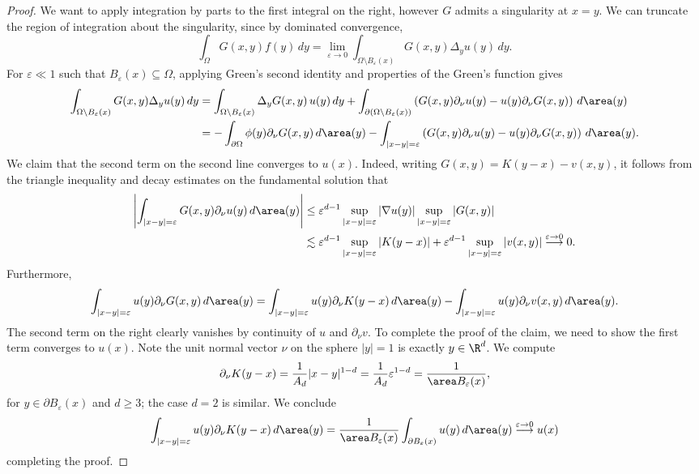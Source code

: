 \documentclass[reqno]{amsart}
\theoremstyle{definition}
\theoremstyle{remark}
\renewcommand{\epsilon}{\varepsilon}
\begin{document}
\begin{proof}
	We want to apply integration by parts to the first integral on the right, however $G$ admits a singularity at $x = y$. We can truncate the region of integration about the singularity, since by dominated convergence, 
		\[ \int_{\Omega} G(x, y) f(y) \, dy = \lim_{\epsilon \to 0}  \int_{\Omega \setminus B_\epsilon (x)} G(x, y) \Delta_y u(y) \, dy .  \]	
	For $\epsilon \ll 1$ such that $B_\epsilon(x) \subseteq \Omega$, applying Green's second identity and properties of the Green's function gives
		\begin{align*}
			 \int_{\Omega \setminus B_\epsilon (x)} G(x, y) \Delta_y u(y) \, dy 
			 	&= \int_{\Omega \setminus B_\epsilon (x)} \Delta_y G(x, y) \, u(y) \, dy + \int_{\partial (\Omega \setminus B_\epsilon (x))} \left( G(x, y) \partial_\nu u(y) - u(y) \partial_\nu G(x, y) \right) \, d\area (y)  \\
			 	&= - \int_{\partial \Omega} \phi (y) \partial_\nu G(x, y) \, d \area (y) - \int_{|x - y| = \epsilon} \left( G(x, y) \partial_\nu u(y) - u(y) \partial_\nu G(x, y) \right) \, d\area (y) .
		\end{align*}
	We claim that the second term on the second line converges to $u(x)$. Indeed, writing $G(x, y) = K(y - x) - v(x, y)$, it follows from the triangle inequality and decay estimates on the fundamental solution that
		\begin{align*}
			\left|\int_{|x - y| = \epsilon} G(x, y) \partial_\nu u (y) \, d \area (y)\right|
				& \leq \epsilon^{d - 1} \sup_{|x - y| = \epsilon} |\nabla u (y)| \sup_{|x - y| = \epsilon} |G(x, y)| \\
				&\lesssim \epsilon^{d - 1} \sup_{|x - y| = \epsilon} |K(y - x)| + \epsilon^{d - 1} \sup_{|x - y| = \epsilon} |v(x, y)| \overset{\epsilon \to 0}{\longrightarrow} 0.
		\end{align*}		 
	Furthermore, 
		\begin{align*}
			\int_{|x - y| = \epsilon} u(y) \partial_\nu G(x, y)  \, d \area (y) = \int_{|x - y| = \epsilon} u(y) \partial_\nu K(y - x) \, d \area (y) - \int_{|x - y| = \epsilon} u(y) \partial_\nu v(x, y) \, d \area (y).  
		\end{align*}
	The second term on the right clearly vanishes by continuity of $u$ and $\partial_\nu v$. To complete the proof of the claim, we need to show the first term converges to $u(x)$. Note the unit normal vector $\nu$ on the sphere $|y| = 1$ is exactly $y \in \R^d$. We compute 
		\[ \partial_\nu K(y - x) = \frac{1}{A_d} |x - y|^{1 - d} = \frac{1}{A_d} \epsilon^{1 - d} = \frac{1}{\area B_\epsilon(x)}, \]
	for $y \in \partial B_\epsilon (x)$ and $d \geq 3$; the case $d = 2$ is similar. We conclude
		\[ \int_{|x - y| = \epsilon} u(y) \partial_\nu K(y - x) \, d \area (y) = \frac{1}{\area B_\epsilon(x)} \int_{\partial B_\epsilon (x)} u(y) \, d \area (y) \overset{\epsilon \to 0}{\longrightarrow} u(x) \]
	completing the proof.  
\end{proof}	
\end{document}
